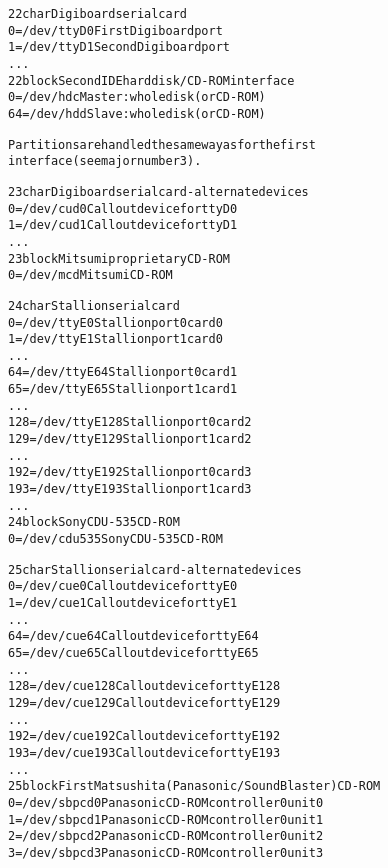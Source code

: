 \documentclass[a4paper,8pt,english]{sphinxmanual}
\begin{document}
\begin{alltt}
  22 char       Digiboard serial card
                  0 = /dev/ttyD0        First Digiboard port
                  1 = /dev/ttyD1        Second Digiboard port
                    ...
  22 block      Second IDE hard disk/CD-ROM interface
                  0 = /dev/hdc          Master: whole disk (or CD-ROM)
                 64 = /dev/hdd          Slave: whole disk (or CD-ROM)

                Partitions are handled the same way as for the first
                interface (see major number 3).

  23 char       Digiboard serial card - alternate devices
                  0 = /dev/cud0         Callout device for ttyD0
                  1 = /dev/cud1         Callout device for ttyD1
                      ...
  23 block      Mitsumi proprietary CD-ROM
                  0 = /dev/mcd          Mitsumi CD-ROM

  24 char       Stallion serial card
                  0 = /dev/ttyE0        Stallion port 0 card 0
                  1 = /dev/ttyE1        Stallion port 1 card 0
                    ...
                 64 = /dev/ttyE64       Stallion port 0 card 1
                 65 = /dev/ttyE65       Stallion port 1 card 1
                      ...
                128 = /dev/ttyE128      Stallion port 0 card 2
                129 = /dev/ttyE129      Stallion port 1 card 2
                    ...
                192 = /dev/ttyE192      Stallion port 0 card 3
                193 = /dev/ttyE193      Stallion port 1 card 3
                    ...
  24 block      Sony CDU-535 CD-ROM
                  0 = /dev/cdu535       Sony CDU-535 CD-ROM

  25 char       Stallion serial card - alternate devices
                  0 = /dev/cue0         Callout device for ttyE0
                  1 = /dev/cue1         Callout device for ttyE1
                    ...
                 64 = /dev/cue64        Callout device for ttyE64
                 65 = /dev/cue65        Callout device for ttyE65
                    ...
                128 = /dev/cue128       Callout device for ttyE128
                129 = /dev/cue129       Callout device for ttyE129
                    ...
                192 = /dev/cue192       Callout device for ttyE192
                193 = /dev/cue193       Callout device for ttyE193
                      ...
  25 block      First Matsushita (Panasonic/SoundBlaster) CD-ROM
                  0 = /dev/sbpcd0       Panasonic CD-ROM controller 0 unit 0
                  1 = /dev/sbpcd1       Panasonic CD-ROM controller 0 unit 1
                  2 = /dev/sbpcd2       Panasonic CD-ROM controller 0 unit 2
                  3 = /dev/sbpcd3       Panasonic CD-ROM controller 0 unit 3


\end{alltt}
\end{document}

